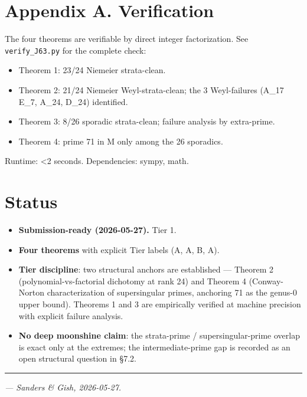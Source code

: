\documentclass[11pt,reqno]{amsart}
\theoremstyle{plain}
\theoremstyle{definition}
\begin{document}
\section{Appendix A. Verification}

The four theorems are verifiable by direct integer factorization. See \texttt{verify_J63.py} for the complete check:
\begin{itemize}
\item Theorem 1: 23/24 Niemeier strata-clean.
\item Theorem 2: 21/24 Niemeier Weyl-strata-clean; the 3 Weyl-failures (A_17 E_7, A_24, D_24) identified.
\item Theorem 3: 8/26 sporadic strata-clean; failure analysis by extra-prime.
\item Theorem 4: prime 71 in M only among the 26 sporadics.
\end{itemize}

Runtime: <2 seconds. Dependencies: sympy, math.

\section{Status}

\begin{itemize}
\item \textbf{Submission-ready (2026-05-27).} Tier 1.
\item \textbf{Four theorems} with explicit Tier labels (A, A, B, A).
\item \textbf{Tier discipline}: two structural anchors are established --- Theorem 2 (polynomial-vs-factorial dichotomy at rank 24) and Theorem 4 (Conway-Norton characterization of supersingular primes, anchoring 71 as the genus-0 upper bound). Theorems 1 and 3 are empirically verified at machine precision with explicit failure analysis.
\item \textbf{No deep moonshine claim}: the strata-prime / supersingular-prime overlap is exact only at the extremes; the intermediate-prime gap is recorded as an open structural question in §7.2.
\end{itemize}

\medskip\hrule\medskip

\textit{--- Sanders \& Gish, 2026-05-27.}
\end{document}
